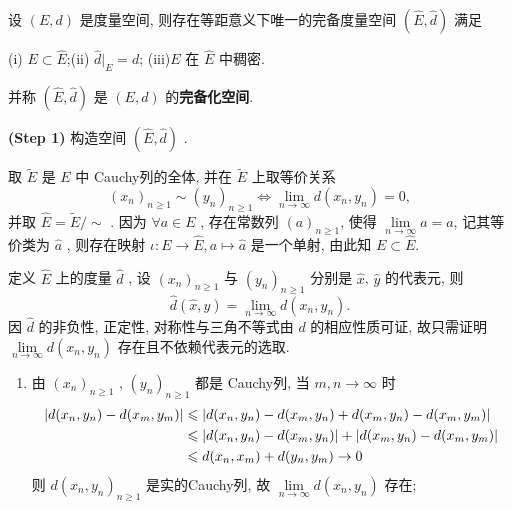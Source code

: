 \begin{Theorem}[度量空间的完备化]
	设 $ (E, d) $ 是度量空间, 则存在等距意义下唯一的完备度量空间 $ (\widehat{E}, \hat{d}) $ 满足

	(i) $ E\subset \widehat{E} $;\hspace{6em}(ii) $ \hat{d}|_{E}=d $;\hspace{6em}  (iii)$ E $ 在 $ \widehat{E} $ 中稠密.

	\noindent 并称 $ (\widehat{E}, \hat{d}) $ 是 $ (E, d) $ 的\textbf{完备化空间}.
\end{Theorem}
\begin{Proof}

	\textbf{(Step 1)} 构造空间 $ (\widehat{E}, \hat{d}) $ .

	取 $ \widetilde{E} $ 是 $ E $ 中 Cauchy列的全体, 并在 $ \widetilde{E} $ 上取等价关系
	\[
		(x_{n})_{n\geqslant1}\sim (y_{n})_{n\geqslant1}\Longleftrightarrow \lim_{n\to\infty}d(x_{n},y_{n})=0,
	\]
	并取 $ \widehat{E}=\widetilde{E}/\sim $ . 因为 $ \forall a\in E $ , 存在常数列  $ (a)_{n\geqslant1} $, 使得 $ \lim\limits_{n\to\infty}a=a $, 记其等价类为 $ \hat{a} $ , 则存在映射 $ \iota :E\to\widehat{E}, a\mapsto \hat{a} $ 是一个单射, 由此知 $ E\subset\widehat{E} $.

	定义 $ \widehat{E} $ 上的度量 $ \hat{d} $ , 设 $ (x_{n})_{n\geqslant1} $ 与 $ (y_{n})_{n\geqslant1} $ 分别是 $ \hat{x} $, $ \hat{y} $ 的代表元, 则
	\[
		\hat{d}(\hat{x}, \hat{y})=\lim_{n\to\infty}d(x_{n},y_{n}).
	\]
	因 $ \hat{d} $ 的非负性, 正定性, 对称性与三角不等式由 $ d $ 的相应性质可证, 故只需证明 $ \lim\limits_{n\to\infty}d(x_{n}, y_{n}) $ 存在且不依赖代表元的选取.

	\begin{enumerate}[(1)]

		\item 由 $ (x_{n})_{n\geqslant1} $ , $ (y_{n})_{n\geqslant1} $ 都是 Cauchy列, 当 $ m, n\to\infty $ 时
		      \[
			      \begin{aligned}
				      \left| d(x_{n}, y_{n})-d(x_{m}, y_{m}) \right|  & \leqslant \left| d(x_{n}, y_{n})-d(x_{m}, y_{n})+ d(x_{m}, y_{n})-d(x_{m}, y_{m}) \right|       \\
				                                            & \leqslant \left| d(x_{n}, y_{n})-d(x_{m}, y_{n}) \right| +\left| d(x_{m}, y_{n})-d(x_{m}, y_{m}) \right|  \\
				                                            & \leqslant d(x_{n}, x_{m})+d(y_{n}, y_{m})\to 0
			      \end{aligned}
		      \]
		      则 $ d(x_{n}, y_{n})_{n\geqslant1} $ 是实的Cauchy列,  故 $ \lim\limits_{n\to\infty}d(x_{n}, y_{n}) $ 存在;


\end{enumerate}
\end{Proof}
